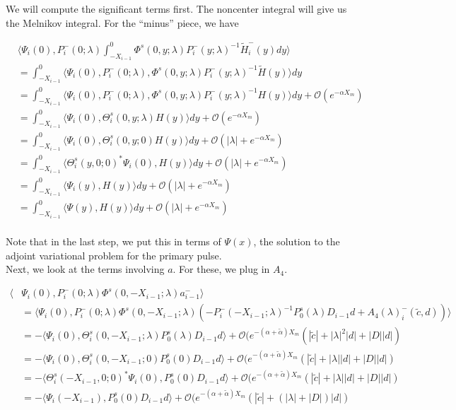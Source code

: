 \documentclass[12pt]{article}
\begin{document}
We will compute the significant terms first. The noncenter integral will give us the Melnikov integral. For the ``minus'' piece, we have

\begin{align*}
&\langle \Psi_i(0), P_i^-(0; \lambda) \int_{-X_{i-1}}^0 \Phi^s(0, y; \lambda) P_i^-(y; \lambda)^{-1} \tilde{H}_i^-(y) dy \rangle \\
&= \int_{-X_{i-1}}^0 \langle \Psi_i(0), P_i^-(0; \lambda), \Phi^s(0, y; \lambda) P_i^-(y; \lambda)^{-1} \tilde{H}(y) \rangle dy \\
&= \int_{-X_{i-1}}^0 \langle \Psi_i(0), P_i^-(0; \lambda), \Phi^s(0, y; \lambda) P_i^-(y; \lambda)^{-1} H(y) \rangle dy + \mathcal{O}({e^{-\alpha X_m}})\\
&= \int_{-X_{i-1}}^0 \langle \Psi_i(0), \Theta_i^s(0, y; \lambda) H(y) \rangle dy + \mathcal{O}({e^{-\alpha X_m}})\\
&= \int_{-X_{i-1}}^0 \langle \Psi_i(0), \Theta_i^s(0, y; 0) H(y) \rangle dy + \mathcal{O}(|\lambda| + {e^{-\alpha X_m}})\\
&= \int_{-X_{i-1}}^0 \langle \Theta_i^s(y, 0; 0)^* \Psi_i(0), H(y) \rangle dy + \mathcal{O}(|\lambda| + {e^{-\alpha X_m}})\\
&= \int_{-X_{i-1}}^0 \langle \Psi_i(y), H(y) \rangle dy + \mathcal{O}(|\lambda| + {e^{-\alpha X_m}})\\
&= \int_{-X_{i-1}}^0 \langle \Psi(y), H(y) \rangle dy + \mathcal{O}(|\lambda| + {e^{-\alpha X_m}})\\
\end{align*}

Note that in the last step, we put this in terms of $\Psi(x)$, the solution to the adjoint variational problem for the primary pulse.\\

Next, we look at the terms involving $a$. For these, we plug in $A_4$.

\begin{align*}
\langle &\Psi_i(0), P_i^-(0; \lambda) \Phi^s(0, -X_{i-1}; \lambda) a_{i-1}^- \rangle \\
&= \langle \Psi_i(0), P_i^-(0; \lambda) \Phi^s(0, -X_{i-1}; \lambda) (- P_i^-(-X_{i-1}; \lambda)^{-1} P_0^s(\lambda) D_{i-1} d + A_4(\lambda)_i^-(\tilde{c}, d)) \rangle \\
&= -\langle \Psi_i(0), \Theta_i^s(0, -X_{i-1}; \lambda) P_0^s(\lambda) D_{i-1} d \rangle + \mathcal{O}( e^{-(\alpha + \tilde{\alpha})X_m}(|\tilde{c}| + |\lambda|^2 |d| + |D||d|) \\
&= -\langle \Psi_i(0), \Theta_i^s(0, -X_{i-1}; 0) P_0^s(0) D_{i-1} d \rangle + \mathcal{O}( e^{-(\alpha + \tilde{\alpha})X_m}(|\tilde{c}| + |\lambda||d| + |D||d|) \\
&= -\langle \Theta_i^s(-X_{i-1}, 0; 0)^* \Psi_i(0), P_0^s(0) D_{i-1} d \rangle + \mathcal{O}( e^{-(\alpha + \tilde{\alpha})X_m}(|\tilde{c}| + |\lambda||d| + |D||d|) \\
&= -\langle \Psi_i(-X_{i-1}), P_0^s(0) D_{i-1} d \rangle + \mathcal{O}( e^{-(\alpha + \tilde{\alpha})X_m}(|\tilde{c}| + (|\lambda| + |D|)|d|) \\
\end{align*}
\end{document}
